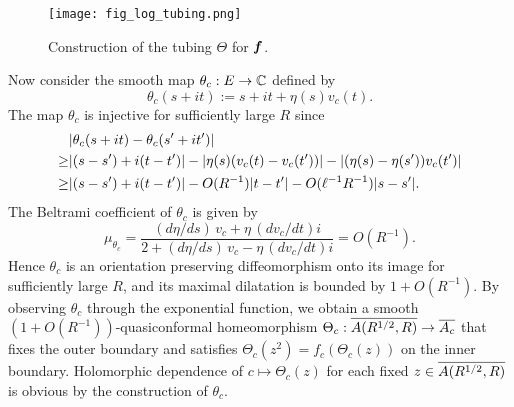 \begin{figure}[htbp]
\begin{center}
\texttt{[image: fig\_log\_tubing.png]}
\end{center}
\caption{\small Construction of the tubing $\Theta$ for $\bs{f}$.}
\label{fig_tubing}
\end{figure}
Now consider the smooth map $\theta_c: E \to \C$ defined by
$$
\theta_c(s+it):= s+it + \eta(s)v_c(t).
$$
The map $\theta_c$ is injective for sufficiently large $R$ since 
\begin{align}
&|\theta_c(s+it)-\theta_c(s'+it')| \notag \\ 
\ge& |(s-s') + i(t-t')| 
- |\eta(s)(v_c(t)-v_c(t'))| 
- |(\eta(s)-\eta(s'))v_c(t')|  \notag \\
\ge &
|(s-s') + i(t-t')| 
- O(R^{-1})|t-t'|
- O(\ell^{-1}R^{-1})|s-s'|. \label{eq_injectivity}
\end{align}
The Beltrami coefficient of $\theta_c$ is given by 
$$
\mu_{\theta_c} = 
\frac{(d\eta/ds)\,v_c+\eta \,(dv_c/dt) i}
{2+(d\eta/ds)\, v_c-\eta\, (dv_c/dt) i}
=O(R^{-1}).
$$
Hence $\theta_c$ is an orientation preserving diffeomorphism onto its image
for sufficiently large $R$,
and its maximal dilatation is bounded by $1+O(R^{-1})$.
By observing $\theta_c$
through the exponential function,
we obtain a smooth $(1+O(R^{-1}))$-quasiconformal homeomorphism 
$\Theta_c: \Bar{A(R^{1/2},R)} \to \Bar{A_c}$ 
that fixes the outer boundary
and satisfies 
$\Theta_c(z^2)=f_c(\Theta_c(z))$ on the inner boundary.
Holomorphic dependence of $c \mapsto \Theta_c(z)$
for each fixed $z \in \Bar{A(R^{1/2},R)}$
is obvious by the construction of $\theta_c$.


